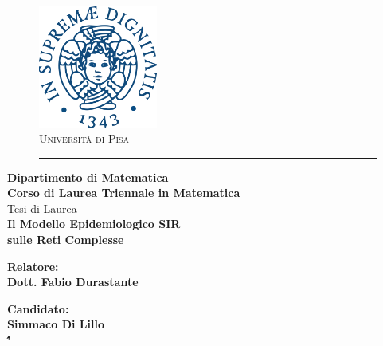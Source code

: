 \documentclass[12pt,a4paper,twoside]{report}
\begin{document}
\begin{titlepage}
\begin{figure}[t]
	\centering\includegraphics[width=0.35\textwidth]{figure/stemma_unipi.png}\\[1em]
	{\LARGE \textsc{Università di Pisa}}\\
	\vspace*{-0.5em}\rule{0.6\textwidth}{0.4pt}
\end{figure}
\begin{center}
	\textbf{ Dipartimento di Matematica\\ Corso di Laurea Triennale in Matematica \\}
	\vspace{15mm}
	{\centering Tesi di Laurea}\\[1em]
    {\LARGE{\bf Il Modello Epidemiologico SIR \\ sulle Reti Complesse}}\\
	\vspace{3mm}
\end{center}

\vspace{36mm}

\begin{minipage}[t]{0.47\textwidth}
	{\large{\bf Relatore:\\Dott. Fabio Durastante}}
\end{minipage}\hfill
\begin{minipage}[t]{0.47\textwidth}\raggedleft
	{\large{\bf Candidato:\\Simmaco Di Lillo\\\''}}
\end{minipage}

\vfill
\centering{\rule{0.5\textwidth}{0.4pt}}\\

\end{titlepage}

\begin{abstract}
\cite{KISS}

\end{abstract}






\end{document}
